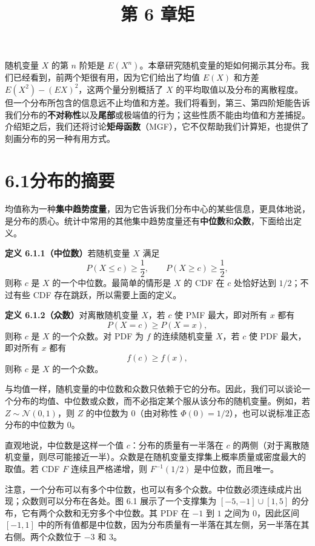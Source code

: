 \documentclass[UTF8,12pt,a4paper,fontset=fandol]{ctexart}
\title{第 6 章\quad 矩}
\author{}
\date{}
\begin{document}
\maketitle

随机变量 $X$ 的第 $n$ 阶矩是 $E(X^n)$。本章研究随机变量的矩如何揭示其分布。我们已经看到，前两个矩很有用，因为它们给出了均值 $E(X)$ 和方差 $E(X^2)-(EX)^2$，这两个量分别概括了 $X$ 的平均取值以及分布的离散程度。但一个分布所包含的信息远不止均值和方差。我们将看到，第三、第四阶矩能告诉我们分布的\textbf{不对称性}以及\textbf{尾部}或极端值的行为；这些性质不能由均值和方差捕捉。介绍矩之后，我们还将讨论\textbf{矩母函数}（MGF），它不仅帮助我们计算矩，也提供了刻画分布的另一种有用方式。

\section*{6.1\quad 分布的摘要}

均值称为一种\textbf{集中趋势度量}，因为它告诉我们分布中心的某些信息，更具体地说，是分布的质心。统计中常用的其他集中趋势度量还有\textbf{中位数}和\textbf{众数}，下面给出定义。

\noindent\textbf{定义 6.1.1（中位数）}\quad 若随机变量 $X$ 满足
\[
  P(X\le c)\ge \frac12,\qquad P(X\ge c)\ge \frac12,
\]
则称 $c$ 是 $X$ 的一个中位数。最简单的情形是 $X$ 的 CDF 在 $c$ 处恰好达到 $1/2$；不过有些 CDF 存在跳跃，所以需要上面的定义。

\noindent\textbf{定义 6.1.2（众数）}\quad 对离散随机变量 $X$，若 $c$ 使 PMF 最大，即对所有 $x$ 都有
\[
  P(X=c)\ge P(X=x),
\]
则称 $c$ 是 $X$ 的一个众数。对 PDF 为 $f$ 的连续随机变量 $X$，若 $c$ 使 PDF 最大，即对所有 $x$ 都有
\[
  f(c)\ge f(x),
\]
则称 $c$ 是 $X$ 的一个众数。

与均值一样，随机变量的中位数和众数只依赖于它的分布。因此，我们可以谈论一个分布的均值、中位数或众数，而不必指定某个服从该分布的随机变量。例如，若 $Z\sim\mathcal{N}(0,1)$，则 $Z$ 的中位数为 $0$（由对称性 $\Phi(0)=1/2$），也可以说标准正态分布的中位数为 $0$。

直观地说，中位数是这样一个值 $c$：分布的质量有一半落在 $c$ 的两侧（对于离散随机变量，则尽可能接近一半）。众数是在随机变量支撑集上概率质量或密度最大的取值。若 CDF $F$ 连续且严格递增，则 $F^{-1}(1/2)$ 是中位数，而且唯一。

注意，一个分布可以有多个中位数，也可以有多个众数。中位数必须连续成片出现；众数则可以分布在各处。图 6.1 展示了一个支撑集为 $[-5,-1]\cup[1,5]$ 的分布，它有两个众数和无穷多个中位数。其 PDF 在 $-1$ 到 $1$ 之间为 $0$，因此区间 $[-1,1]$ 中的所有值都是中位数，因为分布质量有一半落在其左侧，另一半落在其右侧。两个众数位于 $-3$ 和 $3$。
\end{document}
